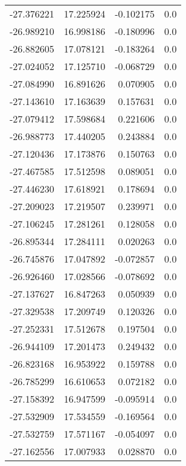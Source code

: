 \begin{tabular}{rrrr}
      -27.376221 &        17.225924 &   -0.102175 &   0.0 \\
      -26.989210 &        16.998186 &   -0.180996 &   0.0 \\
      -26.882605 &        17.078121 &   -0.183264 &   0.0 \\
      -27.024052 &        17.125710 &   -0.068729 &   0.0 \\
      -27.084990 &        16.891626 &    0.070905 &   0.0 \\
      -27.143610 &        17.163639 &    0.157631 &   0.0 \\
      -27.079412 &        17.598684 &    0.221606 &   0.0 \\
      -26.988773 &        17.440205 &    0.243884 &   0.0 \\
      -27.120436 &        17.173876 &    0.150763 &   0.0 \\
      -27.467585 &        17.512598 &    0.089051 &   0.0 \\
      -27.446230 &        17.618921 &    0.178694 &   0.0 \\
      -27.209023 &        17.219507 &    0.239971 &   0.0 \\
      -27.106245 &        17.281261 &    0.128058 &   0.0 \\
      -26.895344 &        17.284111 &    0.020263 &   0.0 \\
      -26.745876 &        17.047892 &   -0.072857 &   0.0 \\
      -26.926460 &        17.028566 &   -0.078692 &   0.0 \\
      -27.137627 &        16.847263 &    0.050939 &   0.0 \\
      -27.329538 &        17.209749 &    0.120326 &   0.0 \\
      -27.252331 &        17.512678 &    0.197504 &   0.0 \\
      -26.944109 &        17.201473 &    0.249432 &   0.0 \\
      -26.823168 &        16.953922 &    0.159788 &   0.0 \\
      -26.785299 &        16.610653 &    0.072182 &   0.0 \\
      -27.158392 &        16.947599 &   -0.095914 &   0.0 \\
      -27.532909 &        17.534559 &   -0.169564 &   0.0 \\
      -27.532759 &        17.571167 &   -0.054097 &   0.0 \\
      -27.162556 &        17.007933 &    0.028870 &   0.0 \\

\end{tabular}
